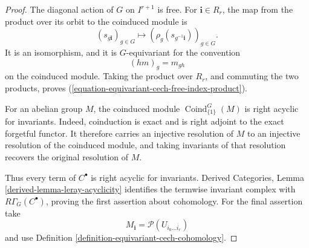 \begin{proof}
The diagonal action of $G$ on $I^{r+1}$ is free. For
$\mathbf{i}\in R_r$, the map from the product over its orbit to the
coinduced module is
$$
(s_{g\mathbf{i}})_{g\in G}
\longmapsto
(\rho_g(s_{g^{-1}\mathbf{i}}))_{g\in G}.
$$
It is an isomorphism, and it is $G$-equivariant for the convention
$$
(h m)_g=m_{gh}
$$
on the coinduced module. Taking the product over $R_r$, and commuting
the two products, proves
(\ref{equation-equivariant-cech-free-index-product}).

For an abelian group $M$, the coinduced module
$\operatorname{Coind}_{\{1\}}^G(M)$ is right acyclic for invariants.
Indeed, coinduction is exact and is right adjoint to the exact forgetful
functor. It therefore carries an injective resolution of $M$ to an
injective resolution of the coinduced module, and taking invariants of
that resolution recovers the original resolution of $M$.

Thus every term of $C^\bullet$ is right acyclic for invariants. Derived
Categories, Lemma \ref{derived-lemma-leray-acyclicity} identifies the
termwise invariant complex with $R\Gamma_G(C^\bullet)$, proving the
first assertion about cohomology. For the final assertion take
$$
M_{\mathbf{i}}
=\mathcal{P}(U_{i_0\ldots i_r})
$$
and use Definition \ref{definition-equivariant-cech-cohomology}.
\end{proof}


